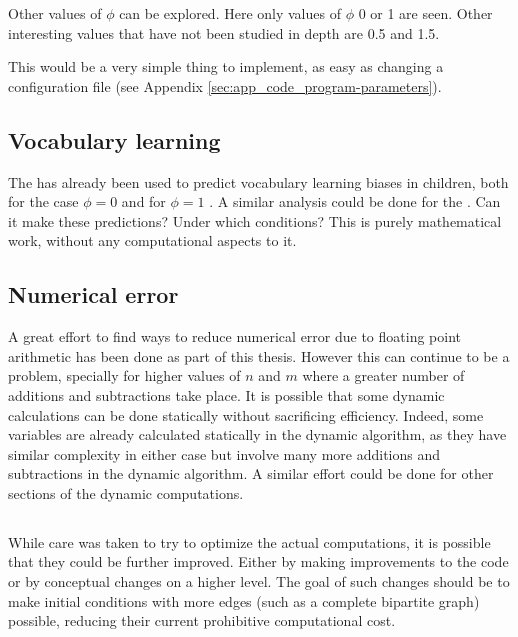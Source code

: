 Other values of $\phi$ can be explored.
Here only values of $\phi$ 0 or 1 are seen.
Other interesting values that have not been studied in depth are 0.5 and 1.5.

This would be a very simple thing to implement, as easy as changing a configuration file (see Appendix \ref{sec:app_code_program-parameters}).

\subsection{Vocabulary learning}
\label{sec:discussion_future-work_vocabulary-learning}

The \firstmodel{} has already been used to predict vocabulary learning biases in children, both for the case $\phi=0$ \cite{Ferrer2017a} and for $\phi=1$ \cite{Carrera2021a}.
A similar analysis could be done for the \secondmodel{}.
Can it make these predictions? Under which conditions? This is purely mathematical work, without any computational aspects to it.

\subsection{Numerical error}
\label{sec:discussion_future-work_numerical-error}

A great effort to find ways to reduce numerical error due to floating point arithmetic has been done as part of this thesis.
However this can continue to be a problem, specially for higher values of $n$ and $m$ where a greater number of additions and subtractions take place.
It is possible that some dynamic calculations can be done statically without sacrificing efficiency.
Indeed, some variables are already calculated statically in the dynamic algorithm, as they have similar complexity in either case but involve many more additions and subtractions in the dynamic algorithm.
A similar effort could be done for other sections of the dynamic computations.

\subsection{}
\label{sec:discussion_future-work_comp-opt}

While care was taken to try to optimize the actual computations, it is possible that they could be further improved.
Either by making improvements to the code or by conceptual changes on a higher level.
The goal of such changes should be to make initial conditions with more edges (such as a complete bipartite graph) possible, reducing their current prohibitive computational cost.

